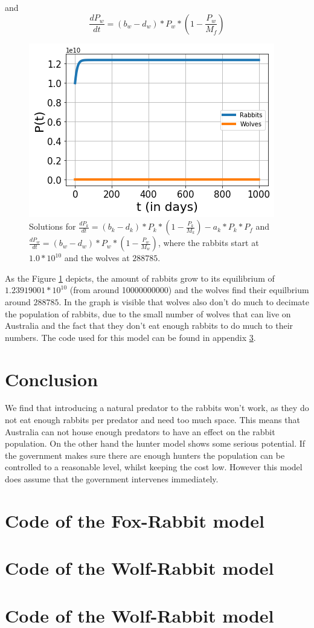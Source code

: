 \documentclass{article}
\begin{document}
and 
$$\frac{dP_w}{dt}=(b_w-d_w)*P_w*(1-\frac{P_w}{M_f})$$
\begin{figure}[h!]
    \centering
    \includegraphics[scale=0.78]{Pictures/RabbitWolves.png}
    \caption{Solutions for $\frac{dP_k}{dt}=(b_k-d_k)*P_k*(1-\frac{P_k}{M_k})-a_k*P_k*P_f$ and $\frac{dP_w}{dt}=(b_w-d_w)*P_w*(1-\frac{P_w}{M_w})$, where the rabbits start at $1.0*10^{10}$ and the wolves at $288785$.}
    \label{fig:RabbitsWolves}
\end{figure}
As the Figure \ref{fig:RabbitsWolves} depicts, the amount of rabbits grow to its equilibrium of $1.23919001*10^{10}$ (from around 10000000000) and the wolves find their equilbrium around $288785$. In the graph is visible that wolves also don't do much to decimate the population of rabbits, due to the small number of wolves that can live on Australia and the fact that they don't eat enough rabbits to do much to their numbers. The code used for this model can be found in appendix \ref{WolfRabbitModel}.
\section{Conclusion}
We find that introducing a natural predator to the rabbits won't work, as they do not eat enough rabbits per predator and need too much space. This means that Australia can not house enough predators to have an effect on the rabbit population. On the other hand the hunter model shows some serious potential. If the government makes sure there are enough hunters the population can be controlled to a reasonable level, whilst keeping the cost low. However this model does assume that the government intervenes immediately.


\appendix
\section{Code of the Fox-Rabbit model}\label{FoxRabbitModel}

\section{Code of the Wolf-Rabbit model}\label{WolfRabbitModel}

\section{Code of the Wolf-Rabbit model}\label{Hunter_model}

\end{document}
